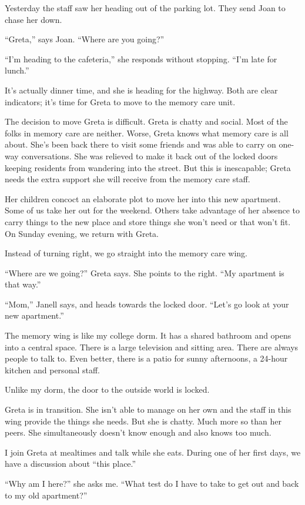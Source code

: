 \documentclass[
  letterpaper,
  DIV=11,
  numbers=noendperiod]{scrreprt}
\begin{document}
Yesterday the staff saw her heading out of the parking lot. They send
Joan to chase her down.

``Greta,'' says Joan. ``Where are you going?''

``I'm heading to the cafeteria,'' she responds without stopping. ``I'm
late for lunch.''

It's actually dinner time, and she is heading for the highway. Both are
clear indicators; it's time for Greta to move to the memory care unit.

The decision to move Greta is difficult. Greta is chatty and social.
Most of the folks in memory care are neither. Worse, Greta knows what
memory care is all about. She's been back there to visit some friends
and was able to carry on one-way conversations. She was relieved to make
it back out of the locked doors keeping residents from wandering into
the street. But this is inescapable; Greta needs the extra support she
will receive from the memory care staff.

Her children concoct an elaborate plot to move her into this new
apartment. Some of us take her out for the weekend. Others take
advantage of her absence to carry things to the new place and store
things she won't need or that won't fit. On Sunday evening, we return
with Greta.

Instead of turning right, we go straight into the memory care wing.

``Where are we going?'' Greta says. She points to the right. ``My
apartment is that way.''

``Mom,'' Janell says, and heads towards the locked door. ``Let's go look
at your new apartment.''

The memory wing is like my college dorm. It has a shared bathroom and
opens into a central space. There is a large television and sitting
area. There are always people to talk to. Even better, there is a patio
for sunny afternoons, a 24-hour kitchen and personal staff.

Unlike my dorm, the door to the outside world is locked.

Greta is in transition. She isn't able to manage on her own and the
staff in this wing provide the things she needs. But she is chatty. Much
more so than her peers. She simultaneously doesn't know enough and also
knows too much.

I join Greta at mealtimes and talk while she eats. During one of her
first days, we have a discussion about ``this place.''

``Why am I here?'' she asks me. ``What test do I have to take to get out
and back to my old apartment?''
\end{document}
